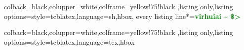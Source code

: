 \documentclass{article}
\begin{document}
\renewcommand*{\tcbdocnew}[1]{\textcolor{green!50!black}{\sffamily\bfseries N} #1}
\renewcommand*{\tcbdocupdated}[1]{\textcolor{blue!75!black}{\sffamily\bfseries U} #1}

%
{colback=black,colupper=white,colframe=yellow!75!black%
,listing only,listing options={style=tcblatex,language=sh},hbox,
every listing line*={\textcolor{green}{\small\ttfamily\bfseries virhuiai \textasciitilde{} \$> }}}


%
{colback=black,colupper=white,colframe=yellow!75!black%
,listing only,listing options={style=tcblatex,language=tex},hbox
}




 
\end{document}
